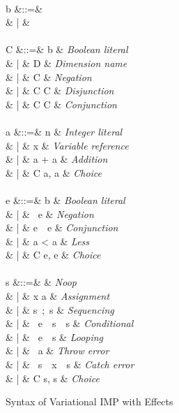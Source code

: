 \documentclass[letterpaper,10pt,onecolumn]{article}
\newcommand{\tagtree}[3]{#1 \langle #2, #3 \rangle}
\begin{document}
\begin{figure}
\begin{syntax}
 \\
b &::=&  \\
& | &  \\
\\
C &::=& b & \textit{Boolean literal} \\
& | & D & \textit{Dimension name} \\
& | & \neg C & \textit{Negation} \\
& | & C \vee C & \textit{Disjunction} \\
& | & C \wedge C & \textit{Conjunction} \\
\\
a &::=& n & \textit{Integer literal} \\
& | & x & \textit{Variable reference} \\
& | & a + a & \textit{Addition} \\
& | & \tagtree{C}{a}{a} & \textit{Choice} \\
 \\
e &::=& b & \textit{Boolean literal} \\
& | & \ e & \textit{Negation} \\
& | & e\ \ e & \textit{Conjunction} \\
& | & a < a & \textit{Less} \\
& | & \tagtree{C}{e}{e} & \textit{Choice} \\
 \\
s &::=&  & \textit{Noop} \\
& | & x \coloneqq a & \textit{Assignment} \\
& | & s\ ;\ s & \textit{Sequencing} \\
& | & \ e\ \ s\ \ s & \textit{Conditional} \\
& | & \ e\ \ s & \textit{Looping} \\
& | & \ a & \textit{Throw error} \\
& | & \ s\ \ x\ \ s & \textit{Catch error} \\
& | & \tagtree{C}{s}{s} & \textit{Choice}
\end{syntax}
\caption{Syntax of Variational IMP with Effects}
\label{fig:vimpsyn}
\end{figure}
\end{document}
